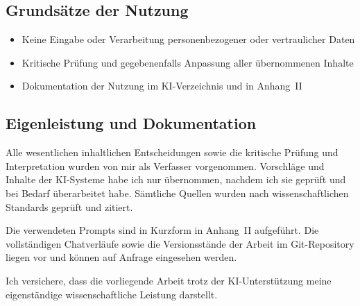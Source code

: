 \subsection*{Grunds\"atze der Nutzung}

\begin{itemize}[leftmargin=1.5em]
	\item Keine Eingabe oder Verarbeitung personenbezogener oder vertraulicher Daten
	\item Kritische Pr\"ufung und gegebenenfalls Anpassung aller \"ubernommenen Inhalte
	\item Dokumentation der Nutzung im KI-Verzeichnis und in Anhang~II
\end{itemize}

\subsection*{Eigenleistung und Dokumentation}

Alle wesentlichen inhaltlichen Entscheidungen sowie die kritische Pr\"ufung und Interpretation wurden von mir als Verfasser vorgenommen. Vorschl\"age und Inhalte der KI-Systeme habe ich nur \"ubernommen, nachdem ich sie gepr\"uft und bei Bedarf \"uberarbeitet habe. S\"amtliche Quellen wurden nach wissenschaftlichen Standards gepr\"uft und zitiert.

Die verwendeten Prompts sind in Kurzform in Anhang~II aufgef\"uhrt. Die vollst\"andigen Chatverl\"aufe sowie die Versionsst\"ande der Arbeit im Git-Repository liegen vor und k\"onnen auf Anfrage eingesehen werden.

Ich versichere, dass die vorliegende Arbeit trotz der KI-Unterst\"utzung meine eigenst\"andige wissenschaftliche Leistung darstellt.

